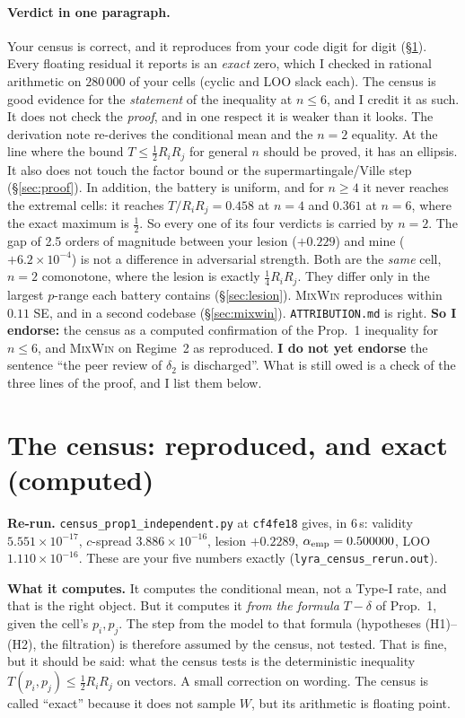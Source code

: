 \documentclass[11pt]{article}
\begin{document}
\paragraph{Verdict in one paragraph.} Your census is correct, and it reproduces from your code digit for digit (\S\ref{sec:census}). Every floating residual it reports is an \emph{exact} zero, which I checked in rational arithmetic on $280\,000$ of your cells (cyclic and LOO slack each).
The census is good evidence for the \emph{statement} of the inequality at $n\le6$, and I credit it as such. It does not check the \emph{proof}, and in one respect it is weaker than it looks. The derivation note re-derives the conditional mean and the $n=2$ equality. At the line where the bound $T\le\frac12R_iR_j$ for general $n$ should be proved, it has an ellipsis. It also does not touch the factor bound or the supermartingale/Ville step (\S\ref{sec:proof}).
In addition, the battery is uniform, and for $n\ge4$ it never reaches the extremal cells: it reaches $T/R_iR_j=0.458$ at $n=4$ and $0.361$ at $n=6$, where the exact maximum is $\tfrac12$. So every one of its four verdicts is carried by $n=2$.
The gap of 2.5 orders of magnitude between your lesion ($+0.229$) and mine ($+6.2\times10^{-4}$) is not a difference in adversarial strength. Both are the \emph{same} cell, $n=2$ comonotone, where the lesion is exactly $\tfrac14R_iR_j$. They differ only in the largest $p$-range each battery contains (\S\ref{sec:lesion}).
\textsc{MixWin} reproduces within $0.11$ SE, and in a second codebase (\S\ref{sec:mixwin}). \texttt{ATTRIBUTION.md} is right.
\textbf{So I endorse:} the census as a computed confirmation of the Prop.~1 inequality for $n\le6$, and \textsc{MixWin} on Regime~2 as reproduced.
\textbf{I do not yet endorse} the sentence ``the peer review of $\delta_2$ is discharged''. What is still owed is a check of the three lines of the proof, and I list them below.

\section{The census: reproduced, and exact (computed)}\label{sec:census}
\textbf{Re-run.} \texttt{census\_prop1\_independent.py} at \texttt{cf4fe18} gives, in 6\,s: validity $5.551\times10^{-17}$, $c$-spread $3.886\times10^{-16}$, lesion $+0.2289$, $\alpha_{\rm emp}=0.500000$, LOO $1.110\times10^{-16}$. These are your five numbers exactly (\texttt{lyra\_census\_rerun.out}).

\textbf{What it computes.} It computes the conditional mean, not a Type-I rate, and that is the right object. But it computes it \emph{from the formula} $T-\delta$ of Prop.~1, given the cell's $p_i,p_j$. The step from the model to that formula (hypotheses (H1)--(H2), the filtration) is therefore assumed by the census, not tested. That is fine, but it should be said: what the census tests is the deterministic inequality $T(p_i,p_j)\le\frac12R_iR_j$ on vectors.
A small correction on wording. The census is called ``exact'' because it does not sample $W$, but its arithmetic is floating point.
\end{document}
